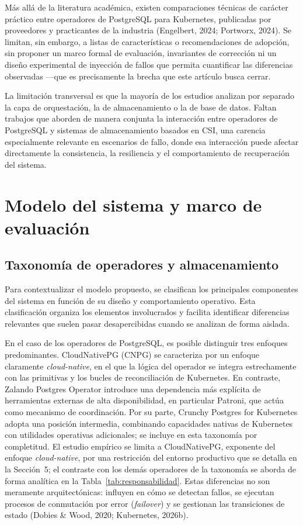 \documentclass[12pt,twocolumn,letterpaper]{article}
\begin{document}
Más allá de la literatura académica, existen comparaciones técnicas de carácter práctico entre operadores de PostgreSQL para Kubernetes, publicadas por proveedores y practicantes de la industria (Engelbert, 2024; Portworx, 2024). Se limitan, sin embargo, a listas de características o recomendaciones de adopción, sin proponer un marco formal de evaluación, invariantes de corrección ni un diseño experimental de inyección de fallos que permita cuantificar las diferencias observadas —que es precisamente la brecha que este artículo busca cerrar.

La limitación transversal es que la mayoría de los estudios analizan por separado la capa de orquestación, la de almacenamiento o la de base de datos. Faltan trabajos que aborden de manera conjunta la interacción entre operadores de PostgreSQL y sistemas de almacenamiento basados en CSI, una carencia especialmente relevante en escenarios de fallo, donde esa interacción puede afectar directamente la consistencia, la resiliencia y el comportamiento de recuperación del sistema.

\section{Modelo del sistema y marco de evaluación}
\subsection{Taxonomía de operadores y almacenamiento}
Para contextualizar el modelo propuesto, se clasifican los principales componentes del sistema en función de su diseño y comportamiento operativo. Esta clasificación organiza los elementos involucrados y facilita identificar diferencias relevantes que suelen pasar desapercibidas cuando se analizan de forma aislada.

En el caso de los operadores de PostgreSQL, es posible distinguir tres enfoques predominantes. CloudNativePG (CNPG) se caracteriza por un enfoque claramente \textit{cloud-native}, en el que la lógica del operador se integra estrechamente con las primitivas y los bucles de reconciliación de Kubernetes. En contraste, Zalando Postgres Operator introduce una dependencia más explícita de herramientas externas de alta disponibilidad, en particular Patroni, que actúa como mecanismo de coordinación. Por su parte, Crunchy Postgres for Kubernetes adopta una posición intermedia, combinando capacidades nativas de Kubernetes con utilidades operativas adicionales; se incluye en esta taxonomía por completitud. El estudio empírico se limita a CloudNativePG, exponente del enfoque \textit{cloud-native}, por una restricción del entorno productivo que se detalla en la Sección~5; el contraste con los demás operadores de la taxonomía se aborda de forma analítica en la Tabla~\ref{tab:responsabilidad}. Estas diferencias no son meramente arquitectónicas: influyen en cómo se detectan fallos, se ejecutan procesos de conmutación por error (\textit{failover}) y se gestionan las transiciones de estado (Dobies \& Wood, 2020; Kubernetes, 2026b).
\end{document}
